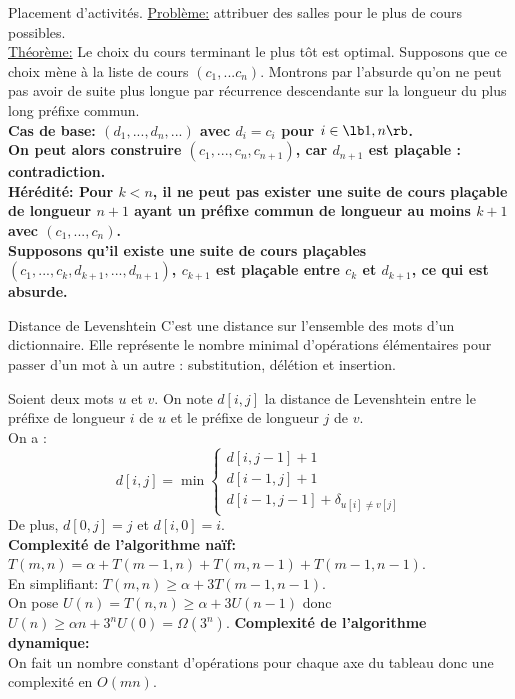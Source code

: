 \documentclass[french, 11pt]{article}
\begin{document}
\begin{ex}{Placement d'activités.}{}
    \underline{Problème:} attribuer des salles pour le plus de cours possibles.\\
    \underline{Théorème:} Le choix du cours terminant le plus tôt est optimal.
    \tcblower
    Supposons que ce choix mène à la liste de cours $(c_1,...c_n)$. Montrons par l'absurde qu'on ne peut pas avoir de suite plus longue par récurrence descendante sur la longueur du plus long préfixe commun.\\
    \bf{Cas de base:} $(d_1,...,d_n,...)$ avec $d_i=c_i$ pour $i\in\lb1,n\rb$.\\
    On peut alors construire $(c_1,...,c_n,c_{n+1})$, car $d_{n+1}$ est plaçable : contradiction.\\
    \bf{Hérédité:} Pour $k<n$, il ne peut pas exister une suite de cours plaçable de longueur $n+1$ ayant un préfixe commun de longueur au moins $k+1$ avec $(c_1,...,c_n)$.\\
    Supposons qu'il existe une suite de cours plaçables $(c_1,...,c_k,d_{k+1},...,d_{n+1})$, $c_{k+1}$ est plaçable entre $c_k$ et $d_{k+1}$, ce qui est absurde.
\end{ex}

\begin{ex}{Distance de Levenshtein}{}
    C'est une distance sur l'ensemble des mots d'un dictionnaire. Elle représente le nombre minimal d'opérations élémentaires pour passer d'un mot à un autre : substitution, délétion et insertion.
    \par Soient deux mots $u$ et $v$. On note $d[i,j]$ la distance de Levenshtein entre le préfixe de longueur $i$ de $u$ et le préfixe de longueur $j$ de $v$.\\
    On a :
    \begin{equation*}
        d[i,j] = \min\begin{cases}
            d[i,j-1] + 1\\
            d[i-1,j] + 1\\
            d[i-1,j-1] + \delta_{u[i] \neq v[j]}
        \end{cases}
    \end{equation*}
    De plus, $d[0,j]=j$ et $d[i,0]=i$.\\
    \textbf{Complexité de l'algorithme naïf:}\\
    $T(m,n)=\alpha + T(m-1,n) + T(m,n-1) + T(m-1,n-1)$.\\
    En simplifiant: $T(m,n) \geq \alpha + 3T(m-1, n-1)$.\\
    On pose $U(n)=T(n,n)\geq\alpha+3U(n-1)$ donc $U(n)\geq\alpha n + 3^nU(0)=\Omega(3^n)$.\n
    \textbf{Complexité de l'algorithme dynamique:}\\
    On fait un nombre constant d'opérations pour chaque axe du tableau donc une complexité en $O(mn)$.
\end{ex}
\end{document}
